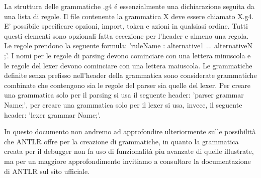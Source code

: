 \documentclass{article}
\theoremstyle{plain}
\theoremstyle{definition}
\theoremstyle{plain}
\begin{document}
La struttura delle grammatiche .g4 é essenzialmente una dichiarazione seguita da una lista di regole. Il file contenente la grammatica X deve essere chiamato X.g4. E' possibile specificare opzioni, import, token e azioni in qualsiasi ordine. Tutti questi elementi sono opzionali fatta eccezione per l'header e almeno una regola. Le regole prendono la seguente formula: 'ruleName : alternative1 \textbar{} ... \textbar{} alternativeN ;'. I nomi per le regole di parsing devono cominciare con una lettera minuscola e le regole del lexer devono cominciare con una lettera maiuscola. Le grammatiche definite senza prefisso nell'header della grammatica sono considerate grammatiche combinate che contengono sia le regole del parser sia quelle del lexer. Per creare una grammatica solo per il parsing si usa il seguente header: 'parser grammar Name;', per creare una grammatica solo per il lexer si usa, invece, il seguente header: 'lexer grammar Name;'.\cite{antlrwebsite}
\smallskip

In questo documento non andremo ad approfondire ulteriormente sulle possibilità che ANTLR offre per la creazione di grammatiche, in quanto la grammatica creata per il debugger non fa uso di funzionalità piu avanzate di quelle illustrate, ma per un maggiore approfondimento invitiamo a consultare la documentazione di ANTLR sul sito ufficiale\cite{antlrwebsite}.
\end{document}
